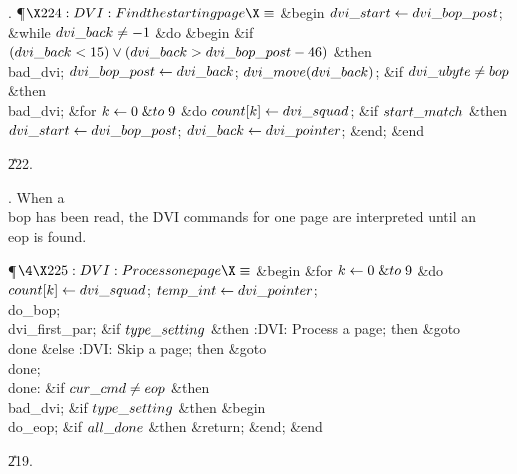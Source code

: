 . \P$\X224:DVI: Find the starting page\X\S$\6
\&{begin} $\\{dvi\_start}\gets\\{dvi\_bop\_post}$;\6
\&{while} $\\{dvi\_back}\ne-1$ \1\&{do}\6
\&{begin} \&{if} $(\\{dvi\_back}<15)\lor(\\{dvi\_back}>\\{dvi\_bop\_post}-46)$
\1\&{then}\5
\\{bad\_dvi};\2\6
$\\{dvi\_bop\_post}\gets\\{dvi\_back}$;\5
$\\{dvi\_move}(\\{dvi\_back})$;\6
\&{if} $\\{dvi\_ubyte}\ne\\{bop}$ \1\&{then}\5
\\{bad\_dvi};\2\6
\&{for} $\hbox{$k$}\gets0\mathrel{\&{to}}9$ \1\&{do}\5
$\\{count}[\hbox{$k$}]\gets\\{dvi\_squad}$;\2\6
\&{if} $\\{start\_match}$ \1\&{then}\5
$\\{dvi\_start}\gets\\{dvi\_bop\_post}$;\2\6
$\\{dvi\_back}\gets\\{dvi\_pointer}$;\6
\&{end};\2\6
\&{end}\par
\U222.\fi

. When a \\{bop} has been read, the \.{DVI} commands for one page are
interpreted until an \\{eop} is found.

\Y\P$\4\X225:DVI: Process one page\X\S$\6
\&{begin} \&{for} $\hbox{$k$}\gets0\mathrel{\&{to}}9$ \1\&{do}\5
$\\{count}[\hbox{$k$}]\gets\\{dvi\_squad}$;\2\6
$\\{temp\_int}\gets\\{dvi\_pointer}$;\5
\\{do\_bop};\5
\\{dvi\_first\_par};\6
\&{if} $\\{type\_setting}$ \1\&{then}\5
:DVI: Process a page; then \&{goto} \\{done}\X\6
\4\&{else} :DVI: Skip a page; then \&{goto} \\{done}\X;\2\6
\4\\{done}: \&{if} $\\{cur\_cmd}\ne\\{eop}$ \1\&{then}\5
\\{bad\_dvi};\2\6
\&{if} $\\{type\_setting}$ \1\&{then}\6
\&{begin} \\{do\_eop};\6
\&{if} $\\{all\_done}$ \1\&{then}\5
\&{return};\2\6
\&{end};\2\6
\&{end}\par
\U219.\fi

